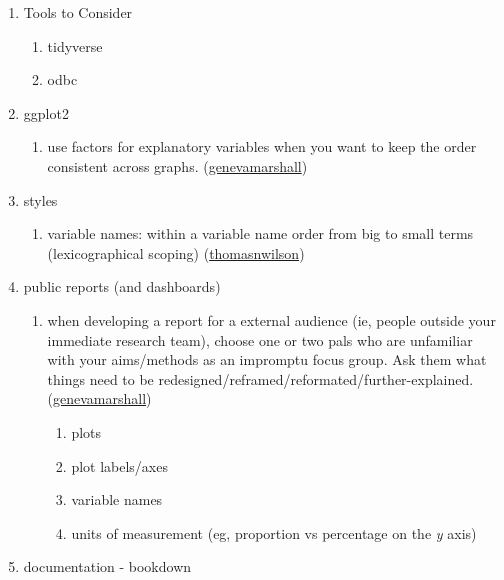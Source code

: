 \documentclass[
]{book}
\providecommand{\tightlist}{%
  \setlength{\itemsep}{0pt}\setlength{\parskip}{0pt}}
\begin{document}
\begin{enumerate}
\def\labelenumi{\arabic{enumi}.}
\item
  Tools to Consider

  \begin{enumerate}
  \def\labelenumii{\arabic{enumii}.}
  \tightlist
  \item
    tidyverse
  \item
    odbc
  \end{enumerate}
\item
  ggplot2

  \begin{enumerate}
  \def\labelenumii{\arabic{enumii}.}
  \tightlist
  \item
    use factors for explanatory variables when you want to keep the order consistent across graphs. (\href{https://github.com/genevamarshall}{genevamarshall})
  \end{enumerate}
\item
  styles

  \begin{enumerate}
  \def\labelenumii{\arabic{enumii}.}
  \tightlist
  \item
    variable names: within a variable name order from big to small terms (lexicographical scoping) (\href{https://github.com/thomasnwilson}{thomasnwilson})
  \end{enumerate}
\item
  public reports (and dashboards)

  \begin{enumerate}
  \def\labelenumii{\arabic{enumii}.}
  \tightlist
  \item
    when developing a report for a external audience (ie, people outside your immediate research team), choose one or two pals who are unfamiliar with your aims/methods as an impromptu focus group. Ask them what things need to be redesigned/reframed/reformated/further-explained. (\href{https://github.com/genevamarshall}{genevamarshall})

    \begin{enumerate}
    \def\labelenumiii{\arabic{enumiii}.}
    \tightlist
    \item
      plots
    \item
      plot labels/axes
    \item
      variable names
    \item
      units of measurement (eg, proportion vs percentage on the \emph{y} axis)
    \end{enumerate}
  \end{enumerate}
\item
  documentation - bookdown


\end{enumerate}
\end{document}
